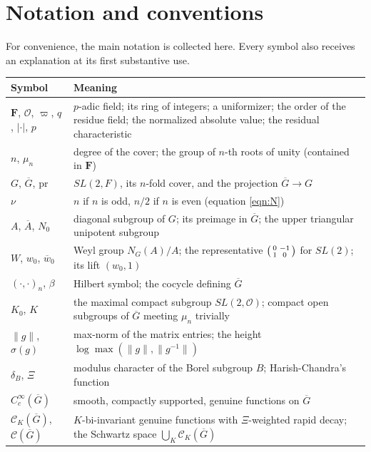 \documentclass[12pt,letterpaper]{article}
\theoremstyle{definition}
\theoremstyle{remark}
\newcommand{\F}{\mathbf{F}}
\newcommand{\bG}{\overline{G}}
\newcommand{\bA}{\overline{A}}
\newcommand{\bw}{\overline{w}}
\newcommand{\pr}{\mathrm{pr}}
\newcommand{\calC}{\mathcal C}
\begin{document}

\section{Notation and conventions}\label{sec:notations}\label{subsec:notsum}

For convenience, the main notation is collected here.  Every symbol also receives an explanation at its first substantive use.

{\small
\begin{longtable}{@{}>{\raggedright}p{4.1cm}>{\raggedright\arraybackslash}p{11.2cm}@{}}
\toprule
\textbf{Symbol} & \textbf{Meaning} \\
\midrule
\endhead
$\F$, $\mathcal O$, $\varpi$, $q$, $|\cdot|$, $p$ & $p$-adic field; its ring of integers; a uniformizer; the order of the residue field; the normalized absolute value; the residual characteristic \\
$n$, $\mu_n$ & degree of the cover; the group of $n$-th roots of unity (contained in $\F$) \\
$G$, $\bG$, $\pr$ & $SL(2,F)$, its $n$-fold cover, and the projection $\bG\to G$ \\
$\nu$ & $n$ if $n$ is odd, $n/2$ if $n$ is even (equation \eqref{eqn:N}) \\
$A$, $\bA$, $N_0$ & diagonal subgroup of $G$; its preimage in $\bG$; the upper triangular unipotent subgroup \\
$W$, $w_0$, $\bw_0$ & Weyl group $N_G(A)/A$; the representative $\begin{psmallmatrix}0&-1\\1&0\end{psmallmatrix}$ for $SL(2)$; its lift $(w_0,1)$ \\
$(\cdot,\cdot)_n$, $\beta$ & Hilbert symbol; the cocycle defining $\bG$ \\
$K_0$, $K$ & the maximal compact subgroup $SL(2,\mathcal O)$; compact open subgroups of $\bG$ meeting $\mu_n$ trivially \\
$\|g\|$, $\sigma(g)$ & max-norm of the matrix entries; the height $\log\max(\|g\|,\|g^{-1}\|)$ \\
$\delta_B$, $\Xi$ & modulus character of the Borel subgroup $B$; Harish-Chandra's function \\
$C_c^\infty(\bG)$ & smooth, compactly supported, genuine functions on $\bG$ \\
$\calC_K(\bG)$, $\calC(\bG)$ & $K$-bi-invariant genuine functions with $\Xi$-weighted rapid decay; the Schwartz space $\bigcup_K\calC_K(\bG)$ \\

\end{longtable}}
\end{document}
